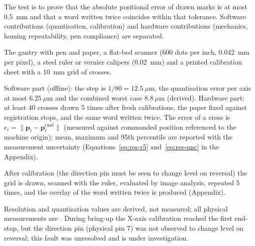 \medskip
\label{sec:res-qtp5}


            The test is to prove that the absolute positional error of drawn marks is at most 0.5~mm and that a word written twice coincides within that tolerance.
            Software contributions (quantisation, calibration) and hardware contributions (mechanics, homing repeatability, pen compliance) are separated.


            The gantry with pen and paper, a flat-bed scanner (600 dots per inch, 0.042~mm per pixel), a steel ruler or vernier calipers (0.02~mm) and a printed calibration sheet with a 10~mm grid of crosses.


            Software part (offline): the step is $1/80=12.5~\mu$m, the quantisation error per axis at most $6.25~\mu$m and the combined worst case $8.8~\mu$m (derived).
            Hardware part: at least 40 crosses drawn 5 times after fresh calibrations, the paper fixed against registration stops, and the same word written twice.
            The error of a cross is $e_i=\lVert\mathbf{p}_i-\mathbf{p}_i^{\mathrm{cmd}}\rVert$ (measured against commanded position referenced to the machine origin); mean, maximum and 95th percentile are reported with the measurement uncertainty (Equations~\ref{eq:res-r5} and~\ref{eq:res-unc} in the Appendix).


            After calibration (the direction pin must be seen to change level on reversal) the grid is drawn, scanned with the ruler, evaluated by image analysis, repeated 5 times, and the overlay of the word written twice is produced (Appendix).


            Resolution and quantisation values are derived, not measured; all physical measurements are \nym{}.
            During bring-up the X-axis calibration reached the first end-stop, but the direction pin (physical pin 7) was not observed to change level on reversal; this fault was unresolved and is under investigation.


